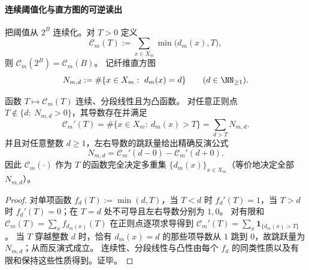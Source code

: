 \paragraph{连续阈值化与直方图的可逆读出}
把阈值从 \(2^B\) 连续化。对 \(T>0\) 定义
\begin{equation}\label{eq:fold-oracle-capacity-continuous-threshold}
\mathcal{C}_m(T):=\sum_{x\in X_m}\min\bigl(d_m(x),T\bigr),
\end{equation}
则 \(\mathcal{C}_m(2^B)=\mathcal{C}_m(B)\)。
记纤维直方图
\[
N_{m,d}:=\#\{x\in X_m:\ d_m(x)=d\}\qquad(d\in\NN_{\ge 1}).
\]

\begin{proposition}[容量曲线的斜率跳跃完全刻画直方图]\label{prop:fold-oracle-capacity-slope-jumps-determine-histogram}
函数 \(T\mapsto \mathcal{C}_m(T)\) 连续、分段线性且为凸函数。
对任意正则点 \(T\notin\{d:\ N_{m,d}>0\}\)，其导数存在并满足
\[
\boxed{\;
\mathcal{C}_m'(T)=\#\{x\in X_m:\ d_m(x)>T\}
=\sum_{d>T}N_{m,d}.\;}
\]
并且对任意整数 \(d\ge 1\)，左右导数的跳跃量给出精确反演公式
\[
\boxed{\;
N_{m,d}=\mathcal{C}_m'(d-0)-\mathcal{C}_m'(d+0).\;}
\]
因此 \(\mathcal{C}_m(\cdot)\) 作为 \(T\) 的函数完全决定多重集 \(\{d_m(x)\}_{x\in X_m}\)（等价地决定全部 \(N_{m,d}\)）。
\end{proposition}
\begin{proof}
对单项函数 \(f_d(T):=\min(d,T)\)，当 \(T<d\) 时 \(f_d'(T)=1\)，当 \(T>d\) 时 \(f_d'(T)=0\)；在 \(T=d\) 处不可导且左右导数分别为 \(1,0\)。
对有限和 \(\mathcal{C}_m(T)=\sum_x f_{d_m(x)}(T)\) 在正则点逐项求导得到
\(
\mathcal{C}_m'(T)=\sum_x \mathbf 1_{\{d_m(x)>T\}}
\)。
当 \(T\) 穿越整数 \(d\) 时，恰有 \(d_m(x)=d\) 的那些项导数从 \(1\) 跳到 \(0\)，故跳跃量为 \(N_{m,d}\)；从而反演式成立。
连续性、分段线性与凸性由每个 \(f_d\) 的同类性质以及有限和保持这些性质得到。证毕。
\end{proof}



